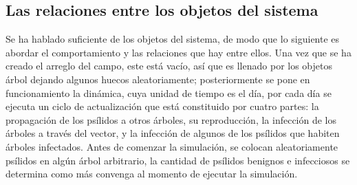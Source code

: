 \subsection{Las relaciones entre los objetos del sistema}
Se ha hablado suficiente de los objetos del sistema, de modo que lo siguiente es abordar el comportamiento y las relaciones que hay entre ellos. Una vez que se ha creado el arreglo del campo, este está vacío, así que es llenado por los objetos árbol dejando algunos huecos aleatoriamente; posteriormente se pone en funcionamiento la dinámica, cuya unidad de tiempo es el día, por cada día se ejecuta un ciclo de actualización que está constituido por cuatro partes: la propagación de los psílidos a otros árboles, su reproducción, la infección de los árboles a través del vector, y la infección de algunos de los psílidos que habiten árboles infectados. Antes de comenzar la simulación, se colocan aleatoriamente psílidos en algún árbol arbitrario, la cantidad de psílidos benignos e infecciosos se determina como más convenga al momento de ejecutar la simulación.

